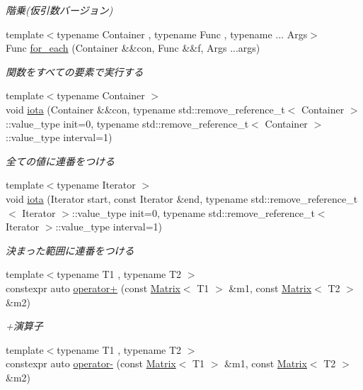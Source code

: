 \begin{DoxyCompactItemize}
\begin{DoxyCompactList}\small\item\em 階乗(仮引数バージョン) \end{DoxyCompactList}\item 
{\footnotesize template$<$typename Container , typename Func , typename ... Args$>$ }\\Func \mbox{\hyperlink{namespacesaki_a0b9cd605250f265e3e827406d8f3232d}{for\+\_\+each}} (Container \&\&con, Func \&\&f, Args ...args)
\begin{DoxyCompactList}\small\item\em 関数をすべての要素で実行する \end{DoxyCompactList}\item 
{\footnotesize template$<$typename Container $>$ }\\void \mbox{\hyperlink{namespacesaki_ae2d32321776d936bd523e70b82f9236c}{iota}} (Container \&\&con, typename std\+::remove\+\_\+reference\+\_\+t$<$ Container $>$\+::value\+\_\+type init=0, typename std\+::remove\+\_\+reference\+\_\+t$<$ Container $>$\+::value\+\_\+type interval=1)
\begin{DoxyCompactList}\small\item\em 全ての値に連番をつける \end{DoxyCompactList}\item 
{\footnotesize template$<$typename Iterator $>$ }\\void \mbox{\hyperlink{namespacesaki_a45760a54288991b21995d0b2338ea134}{iota}} (Iterator start, const Iterator \&end, typename std\+::remove\+\_\+reference\+\_\+t$<$ Iterator $>$\+::value\+\_\+type init=0, typename std\+::remove\+\_\+reference\+\_\+t$<$ Iterator $>$\+::value\+\_\+type interval=1)
\begin{DoxyCompactList}\small\item\em 決まった範囲に連番をつける \end{DoxyCompactList}\item 
{\footnotesize template$<$typename T1 , typename T2 $>$ }\\constexpr auto \mbox{\hyperlink{namespacesaki_a2ce80b823ffc05593663b5ebaeac9ff2}{operator+}} (const \mbox{\hyperlink{classsaki_1_1_matrix}{Matrix}}$<$ T1 $>$ \&m1, const \mbox{\hyperlink{classsaki_1_1_matrix}{Matrix}}$<$ T2 $>$ \&m2)
\begin{DoxyCompactList}\small\item\em +演算子 \end{DoxyCompactList}\item 
{\footnotesize template$<$typename T1 , typename T2 $>$ }\\constexpr auto \mbox{\hyperlink{namespacesaki_a6980888c403aa3728ab24202fe155295}{operator-\/}} (const \mbox{\hyperlink{classsaki_1_1_matrix}{Matrix}}$<$ T1 $>$ \&m1, const \mbox{\hyperlink{classsaki_1_1_matrix}{Matrix}}$<$ T2 $>$ \&m2)

\end{DoxyCompactItemize}
